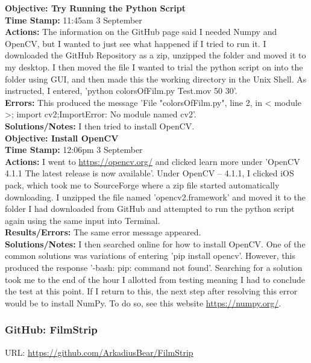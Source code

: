 \documentclass{article}
\begin{document}
\textbf{Objective: Try Running the Python Script}\\
\textbf{Time Stamp:} 11:45am 3 September\\
\textbf{Actions:} The information on the GitHub page said I needed Numpy and OpenCV, but I wanted to just see what happened if I tried to run it. I downloaded the GitHub Repository as a zip, unzipped the folder and moved it to my desktop. I then moved the file I wanted to trial the python script on into the folder using GUI, and then made this the working directory in the Unix Shell. As instructed, I entered, 'python colorsOfFilm.py Test.mov 50 30'.\\
\textbf{Errors:} This produced the message 'File "colorsOfFilm.py", line 2, in \textless{} module \textgreater{}; import cv2;ImportError: No module named cv2'.\\
\textbf{Solutions/Notes:} I then tried to install OpenCV.\\

\textbf{Objective: Install OpenCV}\\
\textbf{Time Stamp:} 12:06pm 3 September\\
\textbf{Actions:} I went to \url{https://opencv.org/} and clicked learn more under 'OpenCV 4.1.1 The latest release is now available'. Under OpenCV – 4.1.1, I clicked iOS pack, which took me to SourceForge where a zip file started automatically downloading. I unzipped the file named 'opencv2.framework' and moved it to the folder I had downloaded from GitHub and attempted to run the python script again using the same input into Terminal. \\
\textbf{Results/Errors:} The same error message appeared.\\
\textbf{Solutions/Notes:} I then searched online for how to install OpenCV. One of the common solutions was variations of entering 'pip install opencv'. However, this produced the response '-bash: pip: command not found'. Searching for a solution took me to the end of the hour I allotted from testing meaning I had to conclude the test at this point. If I return to this, the next step after resolving this error would be to install NumPy. To do so, see this website \url{https://numpy.org/}.\\

\subsubsection{GitHub: FilmStrip}
URL: \url{https://github.com/ArkadiusBear/FilmStrip}\\
\end{document}
